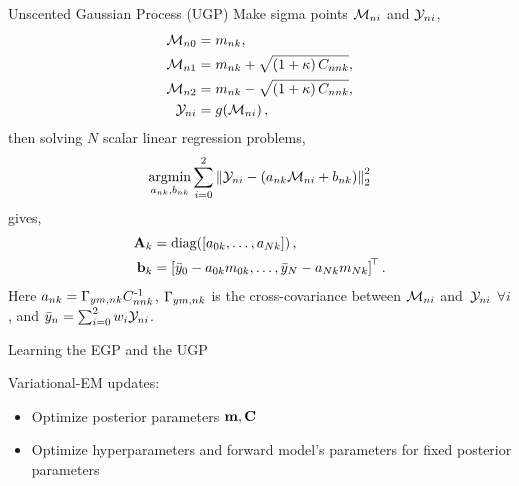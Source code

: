 \documentclass[final]{beamer}
\newlength{\onecolwid}
\begin{document}
\begin{frame}[t]
\begin{columns}[t]
\begin{column}{\onecolwid}
\begin{block}{Unscented Gaussian Process (UGP)}
Make sigma points \cite{Julier2004} $\Sfunc_{ni}$ and $\Sobs_{ni}$,
\begin{align*}
    \Sfunc_{n0} &= \pomeans_{nk}, \\
    \Sfunc_{n1} &= \pomeans_{nk} + \sqrt{\brac{1 + \scoef}\pocovs_{nnk}}, \\
    \Sfunc_{n2} &= \pomeans_{nk} - \sqrt{\brac{1 + \scoef}\pocovs_{nnk}}, \\
    \Sobs_{ni} &= \nonlin{\Sfunc_{ni}},
\end{align*}
then solving $N$ scalar linear regression problems,
\begin{equation*}
    \argmin_{\Lins_{nk}, \intcpts_{nk}} \sum^{2}_{i=0} 
        \lnorm{2}{\Sobs_{ni} - \brac{\Lins_{nk}\Sfunc_{ni} + \intcpts_{nk}}}^2
\end{equation*}
gives,
\begin{align}
    \Linmat_k &= \diag{\sbrac{\Lins_{0k}, \ldots, \Lins_{Nk}}}, \\
    \intcpt_k &= \sbrac{\bar\obss_{0} - \Lins_{0k}\pomeans_{0k}, \ldots,
        \bar\obss_{N} - \Lins_{Nk}\pomeans_{Nk}}\transpose. \nonumber
\end{align}
Here $\Lins_{nk} = \xcovs_{\obss\pomeans,nk} \pocovs_{nnk}\inv$, 
$\xcovs_{\obss\pomeans,nk}$ is the cross-covariance between $\Sfunc_{ni}$ 
and~$\Sobs_{ni}$ $\forall i$, and $\bar\obss_n = \sum_{i=0}^2 \Sw_i
\Sobs_{ni}$.

\end{block}






\begin{block}{Learning the EGP and the UGP}


Variational-EM updates:
\begin{itemize}
	\item
		Optimize posterior parameters $\pomean, \pocov$
	\item
		Optimize hyperparameters and forward model's parameters 
		for fixed posterior parameters
\end{itemize}
\end{block}



\end{column}
\end{columns}
\end{frame}
\end{document}
